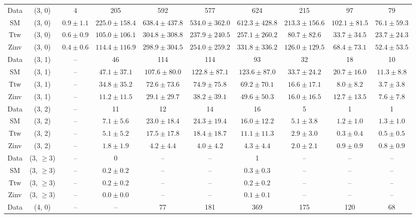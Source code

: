 \begin{table}[h!]
{\begin{tabular}{cccccccccc}
	Data & (3, 0) & 4 & 205 & 592 & 577 & 624 & 215 & 97 & 79 \\[0.5ex] 
	SM & (3, 0) & $0.9\pm 1.1$ & $225.0\pm 158.4$ & $638.4\pm 437.8$ & $534.0\pm 362.0$ & $612.3\pm 428.8$ & $213.3\pm 156.6$ & $102.1\pm 81.5$ & $76.1\pm 59.3$ \\[0.5ex] 
	Ttw & (3, 0) & $0.6\pm 0.9$ & $105.0\pm 106.1$ & $304.8\pm 308.8$ & $237.9\pm 240.5$ & $257.1\pm 260.2$ & $80.7\pm 82.6$ & $33.7\pm 34.5$ & $23.7\pm 24.3$ \\[0.5ex] 
	Zinv & (3, 0) & $0.4\pm 0.6$ & $114.4\pm 116.9$ & $298.9\pm 304.5$ & $254.0\pm 259.2$ & $331.8\pm 336.2$ & $126.0\pm 129.5$ & $68.4\pm 73.1$ & $52.4\pm 53.5$ \\[0.5ex] 
	Data & (3, 1) & -- & 46 & 114 & 114 & 93 & 32 & 18 & 10 \\[0.5ex] 
	SM & (3, 1) & -- & $47.1\pm 37.1$ & $107.6\pm 80.0$ & $122.8\pm 87.1$ & $123.6\pm 87.0$ & $33.7\pm 24.2$ & $20.7\pm 16.0$ & $11.3\pm 8.8$ \\[0.5ex] 
	Ttw & (3, 1) & -- & $34.8\pm 35.2$ & $72.6\pm 73.6$ & $74.9\pm 75.8$ & $69.2\pm 70.1$ & $16.6\pm 17.1$ & $8.0\pm 8.2$ & $3.7\pm 3.8$ \\[0.5ex] 
	Zinv & (3, 1) & -- & $11.2\pm 11.5$ & $29.1\pm 29.7$ & $38.2\pm 39.1$ & $49.6\pm 50.3$ & $16.0\pm 16.5$ & $12.7\pm 13.5$ & $7.6\pm 7.8$ \\[0.5ex] 
	Data & (3, 2) & -- & 11 & 12 & 14 & 16 & 5 & 1 & 1 \\[0.5ex] 
	SM & (3, 2) & -- & $7.1\pm 5.6$ & $23.0\pm 18.4$ & $24.3\pm 19.4$ & $16.0\pm 12.2$ & $5.1\pm 3.8$ & $1.2\pm 1.0$ & $1.3\pm 1.0$ \\[0.5ex] 
	Ttw & (3, 2) & -- & $5.1\pm 5.2$ & $17.5\pm 17.8$ & $18.4\pm 18.7$ & $11.1\pm 11.3$ & $2.9\pm 3.0$ & $0.3\pm 0.4$ & $0.5\pm 0.5$ \\[0.5ex] 
	Zinv & (3, 2) & -- & $1.8\pm 1.9$ & $4.2\pm 4.4$ & $4.0\pm 4.2$ & $4.3\pm 4.4$ & $2.0\pm 2.1$ & $0.9\pm 0.9$ & $0.8\pm 0.9$ \\[0.5ex] 
	Data & (3, $\ge3$) & -- & 0 & -- & -- & 1 & -- & -- & -- \\[0.5ex] 
	SM & (3, $\ge3$) & -- & $0.2\pm 0.2$ & -- & -- & $0.3\pm 0.3$ & -- & -- & -- \\[0.5ex] 
	Ttw & (3, $\ge3$) & -- & $0.2\pm 0.2$ & -- & -- & $0.2\pm 0.2$ & -- & -- & -- \\[0.5ex] 
	Zinv & (3, $\ge3$) & -- & $0.0\pm 0.0$ & -- & -- & $0.1\pm 0.1$ & -- & -- & -- \\[0.5ex] 
	Data & (4, 0) & -- & -- & 77 & 181 & 369 & 175 & 120 & 68 \\[0.5ex] 

\end{tabular}}
\end{table}
